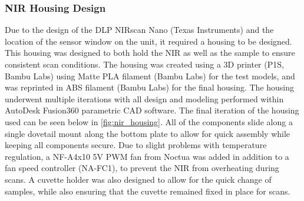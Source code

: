 \documentclass[final, 3p, 11pt]{elsarticle}
\begin{document}
\subsubsection{NIR Housing Design}
Due to the design of the DLP NIRscan Nano (Texas Instruments) and the location of the sensor window on the unit, it required a housing to be designed. This housing was designed to both hold the NIR as well as the sample to ensure consistent scan conditions. The housing was created using a 3D printer (P1S, Bambu Labs) using Matte PLA filament (Bambu Labs) for the test models, and was reprinted in ABS filament (Bambu Labs) for the final housing. 
The housing underwent multiple iterations with all design and modeling performed within AutoDesk Fusion360 parametric CAD software. The final iteration of the housing used can be seen below in \autoref{fig:nir_housing}. All of the components slide along a single dovetail mount along the bottom plate to allow for quick assembly while keeping all components secure. Due to slight problems with temperature regulation, a NF-A4x10 5V PWM fan from Noctua was added in addition to a fan speed controller (NA-FC1), to prevent the NIR from overheating during scans. A cuvette holder was also designed to allow for the quick change of samples, while also ensuring that the cuvette remained fixed in place for scans. 
\end{document}
